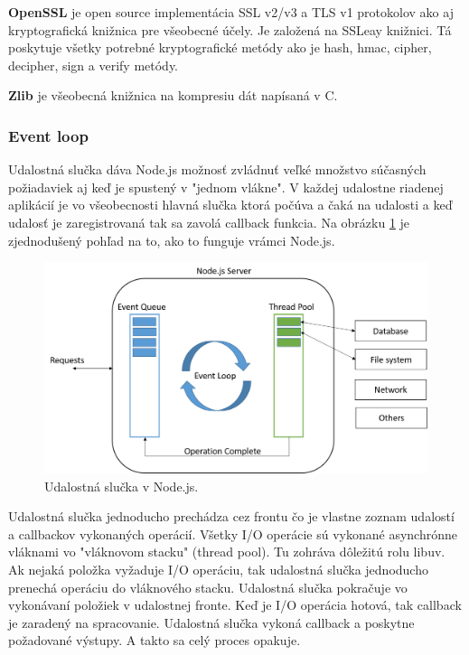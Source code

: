 \textbf{OpenSSL} je open source implementácia SSL v2/v3 a TLS v1 protokolov ako aj kryptografická knižnica pre všeobecné účely. Je založená na SSLeay knižnici. Tá poskytuje všetky potrebné kryptografické metódy ako je hash, hmac, cipher, decipher, sign a verify metódy.

\textbf{Zlib} je všeobecná knižnica na kompresiu dát napísaná v C.\cite{nodejs-arch}


\subsubsection{Event loop}
Udalostná slučka dáva Node.js možnosť zvládnuť veľké množstvo súčasných požiadaviek aj keď je spustený v "jednom vlákne". V každej udalostne riadenej aplikácií je vo všeobecnosti hlavná slučka ktorá počúva a čaká na udalosti a keď udalosť je zaregistrovaná tak sa zavolá callback funkcia. Na obrázku \ref{img-node-event-loop} je zjednodušený pohľad na to, ako to funguje vrámci Node.js.

\begin{figure}[H]
  \centering
  \includegraphics[scale=0.6]{img/node/nodejs-event-loop.png}
  \caption{Udalostná slučka v Node.js.}
  \label{img-node-event-loop}
\end{figure}

Udalostná slučka jednoducho prechádza cez frontu čo je vlastne zoznam udalostí a callbackov vykonaných operácií. Všetky I/O operácie sú vykonané asynchrónne vláknami vo "vláknovom stacku" (thread pool). Tu zohráva dôležitú rolu libuv. Ak nejaká položka vyžaduje I/O operáciu, tak udalostná slučka jednoducho prenechá operáciu do vláknového stacku. Udalostná slučka pokračuje vo vykonávaní položiek v udalostnej fronte. Keď je I/O operácia hotová, tak callback je zaradený na spracovanie. Udalostná slučka vykoná callback a poskytne požadované výstupy. A takto sa celý proces opakuje.\cite{nodejs-event-loop}

